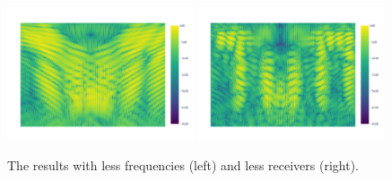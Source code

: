 \begin{figure}[ht]
    \centering
    \includegraphics[page=1, width=0.49\textwidth]{figures/multipath_nlos_reduced_freq.pdf}
    \includegraphics[page=1, width=0.49\textwidth]{figures/multipath_nlos_reduced_receiver.pdf}
    \caption{The results with less frequencies (left) and less receivers (right).}\label{fig:MultipathNLOS_time_optimized}
\end{figure}

